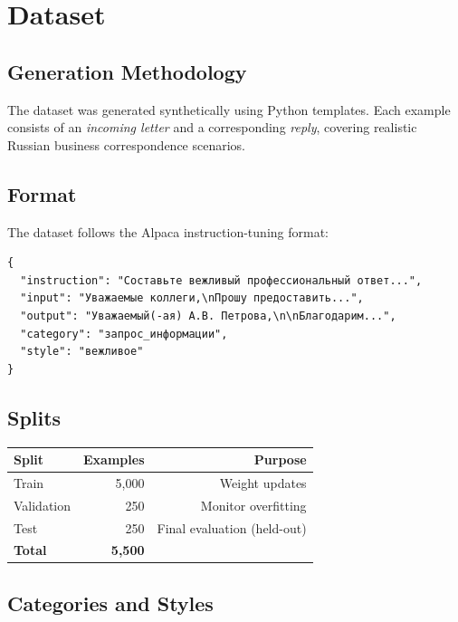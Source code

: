 \documentclass[12pt,a4paper]{article}
\begin{document}
\section{Dataset}

\subsection{Generation Methodology}

The dataset was generated synthetically using Python templates. Each example consists of an \textit{incoming letter} and a corresponding \textit{reply}, covering realistic Russian business correspondence scenarios.

\subsection{Format}

The dataset follows the Alpaca instruction-tuning format:

\begin{lstlisting}
{
  "instruction": "Составьте вежливый профессиональный ответ...",
  "input": "Уважаемые коллеги,\nПрошу предоставить...",
  "output": "Уважаемый(-ая) А.В. Петрова,\n\nБлагодарим...",
  "category": "запрос_информации",
  "style": "вежливое"
}
\end{lstlisting}

\subsection{Splits}

\begin{center}
\begin{tabular}{lrr}
\toprule
Split & Examples & Purpose \\
\midrule
Train & 5,000 & Weight updates \\
Validation & 250 & Monitor overfitting \\
Test & 250 & Final evaluation (held-out) \\
\midrule
\textbf{Total} & \textbf{5,500} & \\
\bottomrule
\end{tabular}
\end{center}

\subsection{Categories and Styles}
\end{document}
